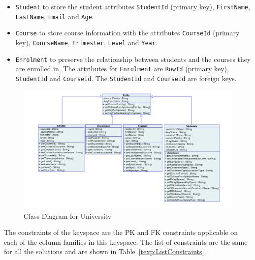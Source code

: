 	\begin{itemize}
	  \item \texttt{Student} to store the student attributes \texttt{StudentId}
	  (primary key),  \texttt{FirstName},  \texttt{LastName},  \texttt{Email} and
	  \texttt{Age}. 
	  \item \texttt{Course} to store course information with the attributes
	  \texttt{CourseId} (primary key),  \texttt{CourseName},  \texttt{Trimester}, 
	  \texttt{Level} and \texttt{Year}. 
	  \item \texttt{Enrolment} to preserve the relationship between students and
	  the courses they are enrolled in.  The attributes for \texttt{Enrolment} are
	  \texttt{RowId} (primary key),  \texttt{StudentId} and \texttt{CourseId}.  The
	  \texttt{StudentId} and \texttt{CourseId} are foreign keys. 
	\end{itemize}
	
	\begin{figure}[h] \centering
		\includegraphics[width=1\textwidth]{./figure/Solutions/classdiagram-experimental.png}
		\caption{Class Diagram for University}\label{fexp:ClassDiagram}
	\end{figure} 

The constraints of the keyspace are the \ac{PK} and \ac{FK} constraints
applicable on each of the column families in this keyspace.  The list of constraints are the same for
all the solutions  and are shown in Table~\ref{texp:ListConstraints}. 


